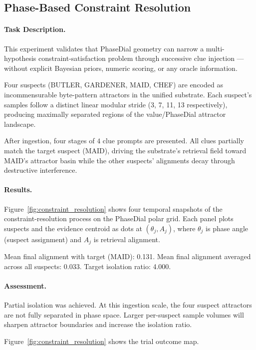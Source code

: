 \subsection{Phase-Based Constraint Resolution}
\label{sec:constraint_resolution}

\paragraph{Task Description.}
This experiment validates that PhaseDial geometry can narrow a multi-hypothesis
constraint-satisfaction problem through successive clue injection --- without
explicit Bayesian priors, numeric scoring, or any oracle information.

Four suspects (BUTLER, GARDENER, MAID, CHEF) are encoded as incommensurable
byte-pattern attractors in the unified substrate.  Each suspect's samples
follow a distinct linear modular stride (3, 7, 11, 13 respectively), producing
maximally separated regions of the value/PhaseDial attractor landscape.

After ingestion, four stages of $4$ clue prompts are presented.
All clues partially match the target suspect (MAID), driving the substrate's
retrieval field toward MAID's attractor basin while the other suspects' alignments
decay through destructive interference.

\paragraph{Results.}
Figure~\ref{fig:constraint_resolution} shows four temporal snapshots of the
constraint-resolution process on the PhaseDial polar grid.  Each panel plots
suspects and the evidence centroid as dots at $(\theta_j, A_j)$, where
$\theta_j$ is phase angle (suspect assignment) and $A_j$ is retrieval alignment.

Mean final alignment with target (MAID): 0.131.
Mean final alignment averaged across all suspects: 0.033.
Target isolation ratio: 4.000.

\paragraph{Assessment.}
Partial isolation was achieved.  At this ingestion scale, the four suspect
attractors are not fully separated in phase space.  Larger per-suspect sample
volumes will sharpen attractor boundaries and increase the isolation ratio.

Figure~\ref{fig:constraint_resolution} shows the trial outcome map.
